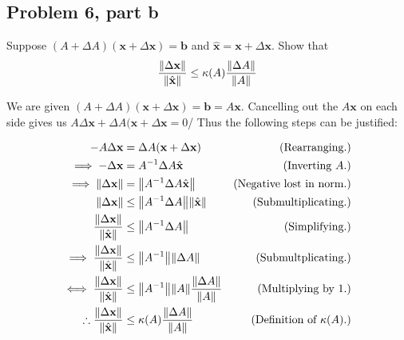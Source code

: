  \subsection{Problem 6, part b}
 Suppose $(A + \Delta A)(\textbf{x} + \Delta \textbf{x}) = \textbf{b}$ and $\hat{\textbf{x}} = \textbf{x} + \Delta \textbf{x}$. Show that 
 \[
 \frac{\norm{\Delta \textbf{x}}}{\norm{\hat{\textbf{x}}}} \leq \kappa(A) \frac{\norm{\Delta A}}{\norm{A}}
 \]
\partbreak
\begin{solution}

 We are given $(A + \Delta A) (\textbf{x} + \Delta \textbf{x}) = \textbf{b} = A\textbf{x}$. Cancelling out the $A\textbf{x}$ on each side gives us $A \Delta \textbf{x} + \Delta A(\textbf{x}+ \Delta\textbf{x} = 0$/ Thus the following steps can be justified:

 \alignbreak
 \begin{align}
     -A\Delta \textbf{x} &= \Delta A(\textbf{x} + \Delta \textbf{x}) &\text{(Rearranging.)}\nonumber\\
     \implies -\Delta \textbf{x} &= A^{-1}\Delta A \hat{\textbf{x}} &\text{(Inverting $A$.)}\nonumber\\
     \implies \norm{\Delta \textbf{x}} &= \norm{A^{-1}\Delta A\hat{\textbf{x}}} &\text{(Negative lost in norm.)}\nonumber\\
     \norm{\Delta \textbf{x}} &\leq \norm{A^{-1}\Delta A} \norm{\hat{\textbf{x}}} &\text{(Submultiplicating.)}\nonumber\\
     \frac{\norm{\Delta \textbf{x}}}{\norm{\hat{\textbf{x}}}} &\leq \norm{A^{-1}\Delta A} &\text{(Simplifying.)}\nonumber\\
     \implies \frac{\norm{\Delta \textbf{x}}}{\norm{\hat{\textbf{x}}}} &\leq \norm{A^{-1}}\norm{\Delta A} &\text{(Submultplicating.)}\nonumber\\
     \iff \frac{\norm{\Delta \textbf{x}}}{\norm{\hat{\textbf{x}}}} &\leq \norm{A^{-1}}\norm{A}\frac{\norm{\Delta A}}{\norm{A}} &\text{(Multiplying by 1.)}\nonumber\\
     \therefore \frac{\norm{\Delta \textbf{x}}}{\norm{\hat{\textbf{x}}}} &\leq \kappa(A)\frac{\norm{\Delta A}}{\norm{A}} &\text{(Definition of $\kappa(A)$.)}\nonumber   
 \end{align}
\end{solution}

\newpage
